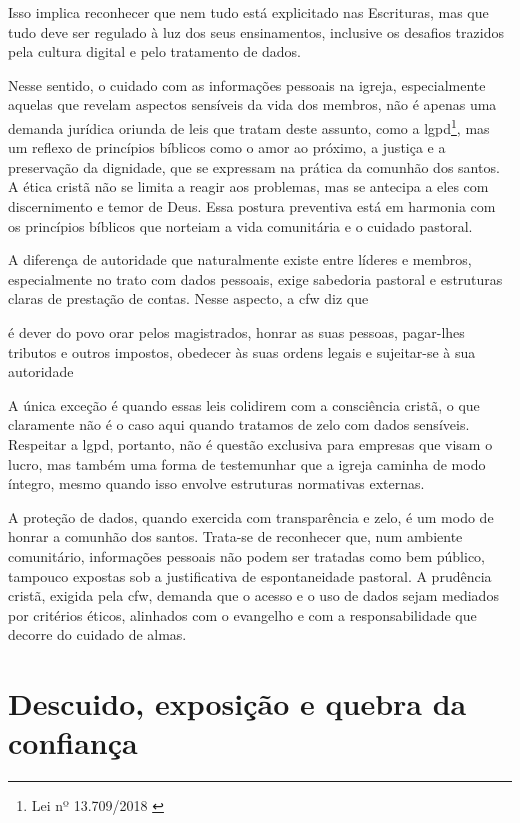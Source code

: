 Isso implica reconhecer que nem tudo está explicitado nas Escrituras, mas que tudo deve ser regulado à luz dos seus ensinamentos, inclusive os desafios trazidos pela cultura digital e pelo tratamento de dados.

Nesse sentido, o cuidado com as informações pessoais na igreja, especialmente aquelas que revelam aspectos sensíveis da vida dos membros, não é apenas uma demanda jurídica oriunda de leis que tratam deste assunto, como a \gls{lgpd}\footnote{Lei nº 13.709/2018 \cite{lgpd2018}}, mas um reflexo de princípios bíblicos como o amor ao próximo, a justiça e a preservação da dignidade, que se expressam na prática da comunhão dos santos. A ética cristã não se limita a reagir aos problemas, mas se antecipa a eles com discernimento e temor de Deus. Essa postura preventiva está em harmonia com os princípios bíblicos que norteiam a vida comunitária e o cuidado pastoral.

A diferença de autoridade que naturalmente existe entre líderes e membros, especialmente no trato com dados pessoais, exige sabedoria pastoral e estruturas claras de prestação de contas. Nesse aspecto, a \gls{cfw} diz que 
\begin{citacao}
é dever do povo orar pelos magistrados, honrar as suas pessoas, pagar-lhes tributos e outros impostos, obedecer às suas ordens legais e sujeitar-se à sua autoridade \cite[Cap.~XXIII]{cfw}    
\end{citacao}
A única exceção é quando essas leis colidirem com a consciência cristã, o que claramente não é o caso aqui quando tratamos de zelo com dados sensíveis. Respeitar a \gls{lgpd}, portanto, não é questão exclusiva para empresas que visam o lucro, mas também uma forma de testemunhar que a igreja caminha de modo íntegro, mesmo quando isso envolve estruturas normativas externas.

A proteção de dados, quando exercida com transparência e zelo, é um modo de honrar a comunhão dos santos. Trata-se de reconhecer que, num ambiente comunitário, informações pessoais não podem ser tratadas como bem público, tampouco expostas sob a justificativa de espontaneidade pastoral. A prudência cristã, exigida pela \gls{cfw}, demanda que o acesso e o uso de dados sejam mediados por critérios éticos, alinhados com o evangelho e com a responsabilidade que decorre do cuidado de almas.

\section{Descuido, exposição e quebra da confiança}

